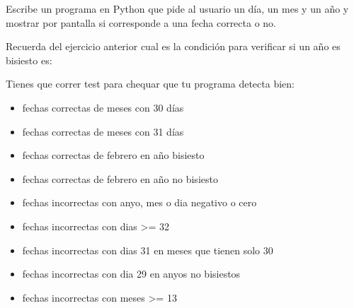 \begin{ejercicio}Escribe un programa en Python que pide al usuario un día, un mes y un año y mostrar por pantalla si corresponde a una fecha correcta o no.

Recuerda del ejercicio anterior cual es la condición para verificar si un año es bisiesto es:


Tienes que correr test para chequar que tu programa detecta bien:

\begin{itemize}[nosep]
    \item fechas correctas de meses con 30 días
    \item fechas correctas de meses con 31 días
    \item fechas correctas de febrero en año bisiesto
    \item fechas correctas de febrero en año no bisiesto
    \item fechas incorrectas con anyo, mes o dia negativo o cero
    \item fechas incorrectas con dias >= 32 
    \item fechas incorrectas con dias 31 en meses que tienen solo 30
    \item fechas incorrectas con dia 29 en anyos no bisiestos
    \item fechas incorrectas con meses >= 13 
    
\end{itemize}
\end{ejercicio}

